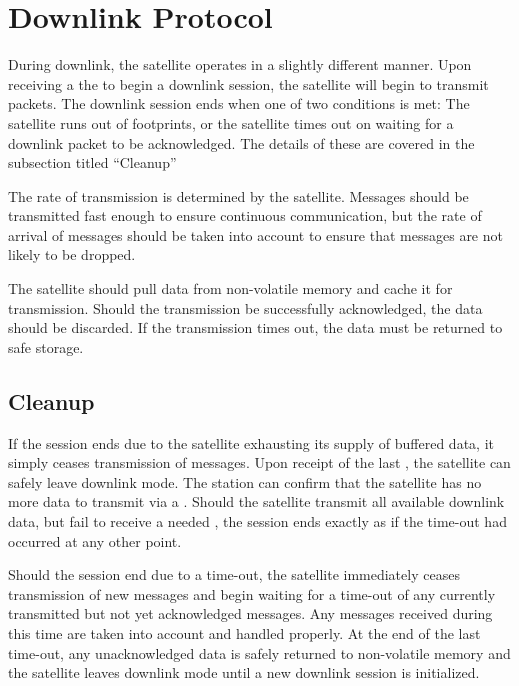 \documentclass{article}
\begin{document}
  
 

\pagebreak[1]
\section{Downlink Protocol}
  During downlink, the satellite operates in a slightly different manner.
  Upon receiving a the to begin a downlink session, the satellite will begin to
  transmit \mdownlink packets. The downlink session ends when one of two
  conditions is met: The satellite runs out of footprints, or the satellite times
  out on waiting for a downlink packet to be acknowledged. The details of these
  are covered in the subsection titled ``Cleanup''
  
  The rate of transmission is determined by the satellite. Messages should be
  transmitted fast enough to ensure continuous communication, but the rate of 
  arrival of \madownlink messages should be taken into account to ensure that
  messages are not likely to be dropped.
  
  The satellite should pull data from non-volatile memory and cache it for
  transmission. Should the transmission be successfully acknowledged, the
  data should be discarded. If the transmission times out, the data must be 
  returned to safe storage.  
  
  \subsection{Cleanup}
    If the session ends due to the satellite exhausting its supply of buffered
    data, it simply ceases transmission of \mdownlink messages. Upon receipt of 
    the last \madownlink, the satellite can safely leave downlink mode. The
    station can confirm that the satellite has no more data to transmit via a 
    \mquery. Should the satellite transmit all available downlink data, but
    fail to receive a needed \madownlink, the session ends exactly as if the
    time-out had occurred at any other point.
    
    Should the session end due to a time-out, the satellite immediately ceases
    transmission of new \mdownlink messages and begin waiting for a time-out of
    any currently transmitted but not yet acknowledged messages. Any \madownlink
    messages received during this time are taken into account and handled
    properly. At the end of the last time-out, any unacknowledged data is safely
    returned to non-volatile memory and the satellite leaves downlink mode until
    a new downlink session is initialized.
\end{document}
